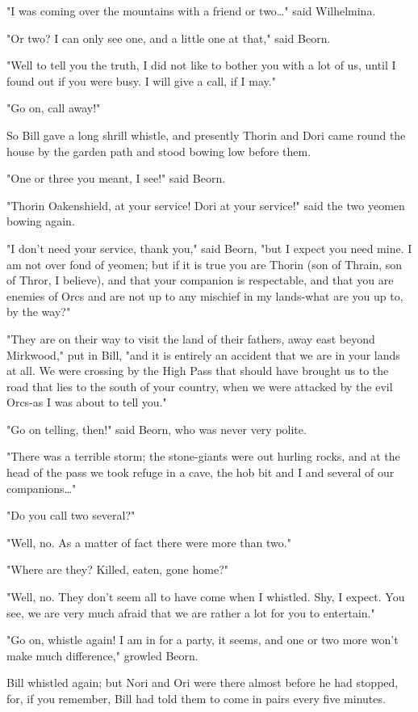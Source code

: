 \documentclass[twoside,11pt,b5paper,twocolumn]{scrbook}
\begin{document}
"I was coming over the mountains with a friend or two…" said Wilhelmina.

"Or two? I can only see one, and a little one at that," said Beorn.

"Well to tell you the truth, I did not like to bother you with a lot of us, until I found out if you were busy. I will give a call, if I may."

"Go on, call away!"

So Bill gave a long shrill whistle, and presently Thorin and Dori came round the house by the garden path and stood bowing low before them.

"One or three you meant, I see!" said Beorn.

"Thorin Oakenshield, at your service! Dori at your service!" said the two yeomen bowing again.

"I don't need your service, thank you," said Beorn, "but I expect you need mine. I am not over fond of yeomen; but if it is true you are Thorin (son of Thrain, son of Thror, I believe), and that your companion is respectable, and that you are enemies of Orcs and are not up to any mischief in my lands-what are you up to, by the way?"

"They are on their way to visit the land of their fathers, away east beyond Mirkwood," put in Bill, "and it is entirely an accident that we are in your lands at all. We were crossing by the High Pass that should have brought us to the road that lies to the south of your country, when we were attacked by the evil Orcs­-as I was about to tell you."

"Go on telling, then!" said Beorn, who was never very polite.

"There was a terrible storm; the stone-giants were out hurling rocks, and at the head of the pass we took refuge in a cave, the hob bit and I and several of our companions…"

"Do you call two several?"

"Well, no. As a matter of fact there were more than two."

"Where are they? Killed, eaten, gone home?"

"Well, no. They don't seem all to have come when I whistled. Shy, I expect. You see, we are very much afraid that we are rather a lot for you to entertain."

"Go on, whistle again! I am in for a party, it seems, and one or two more won't make much difference," growled Beorn.

Bill whistled again; but Nori and Ori were there almost before he had stopped, for, if you remember, Bill had told them to come in pairs every five minutes.
\end{document}
